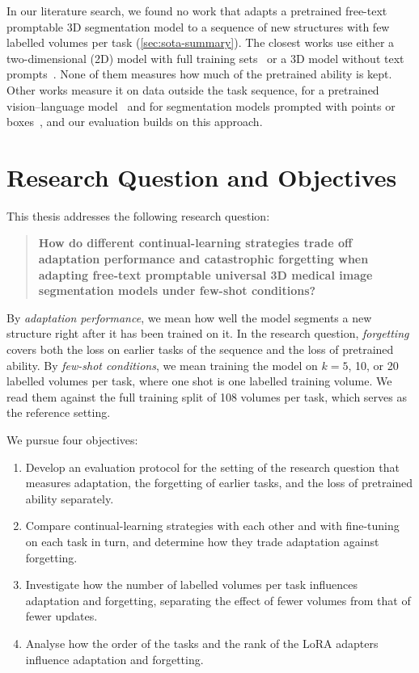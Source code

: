 In our literature search, we found no work that adapts a pretrained free-text promptable 3D segmentation model to a sequence of new structures with few labelled volumes per task (\cref{sec:sota-summary}).
The closest works use either a two-dimensional (2D) model with full training sets~\cite{gao2026medcrpcl,gao2025paewc,gao2026medpeftcl} or a 3D model without text prompts~\cite{chen2026fewshotcontinuallearning3d}.
None of them measures how much of the pretrained ability is kept.
Other works measure it on data outside the task sequence, for a pretrained vision--language model~\cite{Zhang_2024_CVPR} and for segmentation models prompted with points or boxes~\cite{wang2025casam,wang2024sammed3dmoe}, and our evaluation builds on this approach.

\section{Research Question and Objectives}
\label{sec:intro-rq}

This thesis addresses the following research question:
\begin{quote}
\textbf{How do different continual-learning strategies trade off adaptation performance and catastrophic forgetting when adapting free-text promptable universal 3D medical image segmentation models under few-shot conditions?}
\end{quote}
By \emph{adaptation performance}, we mean how well the model segments a new structure right after it has been trained on it.
In the research question, \emph{forgetting} covers both the loss on earlier tasks of the sequence and the loss of pretrained ability.
By \emph{few-shot conditions}, we mean training the model on $k = 5$, 10, or 20 labelled volumes per task, where one shot is one labelled training volume.
We read them against the full training split of 108 volumes per task, which serves as the reference setting.

We pursue four objectives:
\begin{enumerate}
  \item Develop an evaluation protocol for the setting of the research question that measures adaptation, the forgetting of earlier tasks, and the loss of pretrained ability separately.
  \item Compare continual-learning strategies with each other and with fine-tuning on each task in turn, and determine how they trade adaptation against forgetting.
  \item Investigate how the number of labelled volumes per task influences adaptation and forgetting, separating the effect of fewer volumes from that of fewer updates.
  \item Analyse how the order of the tasks and the rank of the LoRA adapters influence adaptation and forgetting.
\end{enumerate}

